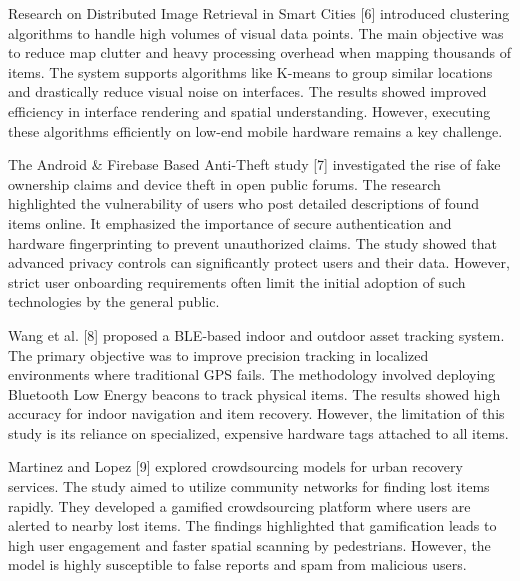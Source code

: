 \documentclass[12pt,a4paper]{report}
\begin{document}
\vspace{0.4cm}

Research on Distributed Image Retrieval in Smart Cities [6] introduced clustering algorithms to handle high volumes of visual data points. The main objective was to reduce map clutter and heavy processing overhead when mapping thousands of items. The system supports algorithms like K-means to group similar locations and drastically reduce visual noise on interfaces. The results showed improved efficiency in interface rendering and spatial understanding. However, executing these algorithms efficiently on low-end mobile hardware remains a key challenge.

\vspace{0.4cm}

The Android \& Firebase Based Anti-Theft study [7] investigated the rise of fake ownership claims and device theft in open public forums. The research highlighted the vulnerability of users who post detailed descriptions of found items online. It emphasized the importance of secure authentication and hardware fingerprinting to prevent unauthorized claims. The study showed that advanced privacy controls can significantly protect users and their data. However, strict user onboarding requirements often limit the initial adoption of such technologies by the general public.

\vspace{0.4cm}

Wang et al. [8] proposed a BLE-based indoor and outdoor asset tracking system. The primary objective was to improve precision tracking in localized environments where traditional GPS fails. The methodology involved deploying Bluetooth Low Energy beacons to track physical items. The results showed high accuracy for indoor navigation and item recovery. However, the limitation of this study is its reliance on specialized, expensive hardware tags attached to all items.

\vspace{0.4cm}

Martinez and Lopez [9] explored crowdsourcing models for urban recovery services. The study aimed to utilize community networks for finding lost items rapidly. They developed a gamified crowdsourcing platform where users are alerted to nearby lost items. The findings highlighted that gamification leads to high user engagement and faster spatial scanning by pedestrians. However, the model is highly susceptible to false reports and spam from malicious users.
\end{document}

